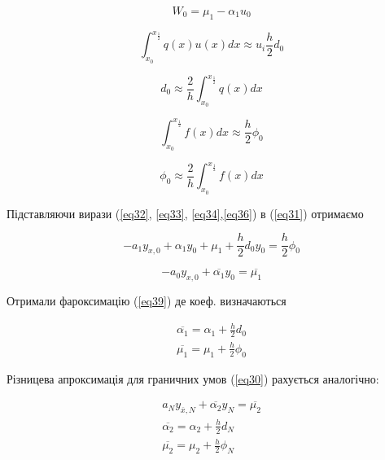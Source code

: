 \documentclass[14pt,a4paper]{scrartcl}
\begin{document}
	\begin{equation}\label{eq33}
		W_{0} = \mu_{1} - \alpha_{1}u_{0}
	\end{equation}
	
	
	\begin{equation}\label{eq34}
		\int_{x_0}^{x_{\frac{1}{2}}}q(x)u(x)dx \approx u_{i}\frac{h}{2}d_{0}
	\end{equation}
	
	\begin{equation}\label{eq35}
		d_{0} \approx \frac{2}{h}\int_{x_0}^{x_{\frac{1}{2}}}q(x)dx
	\end{equation}	
	
	\begin{equation}\label{eq36}
	\int_{x_0}^{x_{\frac{1}{2}}}f(x)dx \approx \frac{h}{2}\phi_{0}
	\end{equation}
	
	\begin{equation}\label{eq37}
	\phi_{0} \approx \frac{2}{h}\int_{x_0}^{x_{\frac{1}{2}}}f(x)dx
	\end{equation}	
	
	
	Підставляючи вирази (\ref{eq32}, \ref{eq33}, \ref{eq34},\ref{eq36}) в (\ref{eq31}) отримаємо
	
	

	\begin{equation}\label{eq38}
		-a_{1}y_{x,0} + \alpha_{1}y_{0} +\mu_{1} + \frac{h}{2}d_{0}y_{0} = \frac{h}{2}\phi_{0}
	\end{equation}
	
	\begin{equation}\label{eq39}
		-a_{0}y_{x,0} + \overline{\alpha_{1}}y_{0} = \overline{\mu_{1}}
	\end{equation}
	
	Отримали фароксимацію (\ref{eq39}) де коеф. визначаються
	
	\begin{gather}
		\overline{\alpha_{1}} = \alpha_{1} +\frac{h}{2}d_{0} \label{eq40}\\
		\overline{\mu_{1}} = \mu_{1} + \frac{h}{2}\phi_{0} \label{eq41}
	\end{gather}

	Різницева апроксимація для граничних умов (\ref{eq30}) рахується аналогічно:
	
	\begin{gather}
		a_{N}y_{\overline{x},N} + \overline{\alpha_{2}}y_{N} = \overline{\mu_{2}}\label{eq42}\\
		\overline{\alpha_{2}} = \alpha_{2} +\frac{h}{2}d_{N}\label{eq43}\\
		\overline{\mu_{2}} = \mu_{2} + \frac{h}{2}\phi_{N} \label{eq44}
	\end{gather}
	
\end{document}
